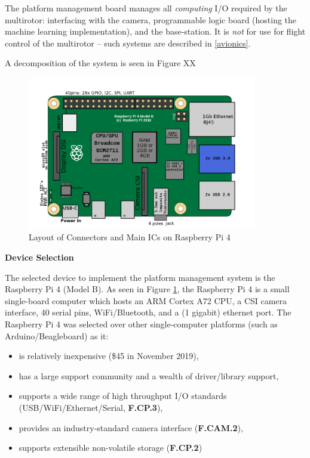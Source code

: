 The platform management board manages all \textit{computing} I/O required by the multirotor: interfacing with the camera, programmable logic board (hosting the machine learning implementation), and the base-station. It is \textit{not} for use for flight control of the multirotor -- such systems are described in \ref{avionics}.

A decomposition of the system is seen in Figure XX

\begin{figure}\label{rpi}
\centering
\includegraphics[width=10cm]{img/RaspberryPi_Model_4B.png}
\caption{Layout of Connectors and Main ICs on Raspberry Pi 4}
\end{figure}

\textbf{Device Selection}

The selected device to implement the platform management system is the Raspberry Pi 4 (Model B). As seen in Figure \ref{rpi}, the Raspberry Pi 4 is a small single-board computer which hosts an ARM Cortex A72 CPU, a CSI camera interface, 40 serial pins, WiFi/Bluetooth, and a (1 gigabit) ethernet port. The Raspberry Pi 4 was selected over other single-computer platforms (such as Arduino/Beagleboard) as it:
\begin{itemize}
\item is relatively inexpensive (\$45 in November 2019),
\item has a large support community and a wealth of driver/library support,
\item supports a wide range of high throughput I/O standards (USB/WiFi/Ethernet/Serial, \textbf{F.CP.3}),
\item provides an industry-standard camera interface (\textbf{F.CAM.2}),
\item supports extensible non-volatile storage (\textbf{F.CP.2})\\
\end{itemize} 

